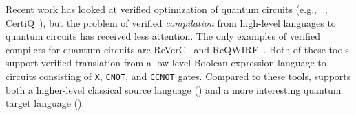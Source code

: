 
Recent work has looked at verified optimization of quantum circuits (e.g., \voqc~\cite{VOQC}, CertiQ~\cite{Shi2019}), but the problem of verified \emph{compilation} from high-level languages to quantum circuits has received less attention.
The only examples of verified compilers for quantum circuits are ReVerC~\cite{reverC} and ReQWIRE~\cite{Rand2018ReQWIRERA}.
Both of these tools support verified translation from a low-level Boolean expression language to circuits consisting of \texttt{X}, \texttt{CNOT}, and \texttt{CCNOT} gates.
Compared to these tools, \name supports both a higher-level classical source language (\vqimp) and a more interesting quantum target language (\vqir).




